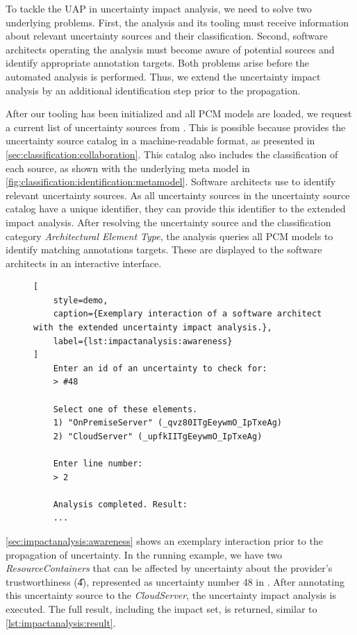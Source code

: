 To tackle the \ac{UAP} in uncertainty impact analysis, we need to solve two underlying problems.
First, the analysis and its tooling must receive information about relevant uncertainty sources and their classification.
Second, software architects operating the analysis must become aware of potential sources and identify appropriate annotation targets.
Both problems arise before the automated analysis is performed.
Thus, we extend the uncertainty impact analysis by an additional identification step prior to the propagation.

After our tooling \uia has been initialized and all \ac{PCM} models are loaded, we request a current list of uncertainty sources from \arcen.
This is possible because \arcen provides the uncertainty source catalog in a machine-readable format, as presented in \autoref{sec:classification:collaboration}.
This catalog also includes the classification of each source, as shown with the underlying meta model in \autoref{fig:classification:identification:metamodel}.
Software architects use \arcen to identify relevant uncertainty sources.
As all uncertainty sources in the uncertainty source catalog have a unique identifier, they can provide this identifier to the extended impact analysis.
After resolving the uncertainty source and the classification category \emph{Architectural Element Type}, the analysis queries all \ac{PCM} models to identify matching annotations targets.
These are displayed to the software architects in an interactive interface.

\begin{figure}
\begin{lstlisting}[
    style=demo,
    caption={Exemplary interaction of a software architect with the extended uncertainty impact analysis.},
    label={lst:impactanalysis:awareness}
]
    Enter an id of an uncertainty to check for:
    > #48

    Select one of these elements.
    1) "OnPremiseServer" (_qvz80ITgEeywmO_IpTxeAg)
    2) "CloudServer" (_upfkIITgEeywmO_IpTxeAg)

    Enter line number:
    > 2

    Analysis completed. Result:
    ...
\end{lstlisting}
\end{figure}

\autoref{sec:impactanalysis:awareness} shows an exemplary interaction prior to the propagation of uncertainty.
In the running example, we have two \emph{ResourceContainers} that can be affected by uncertainty about the provider's trustworthiness (\U{4}), represented as uncertainty number 48 in \arcen.
After annotating this uncertainty source to the \emph{CloudServer}, the uncertainty impact analysis is executed.
The full result, including the impact set, is returned, similar to \autoref{lst:impactanalysis:result}.

